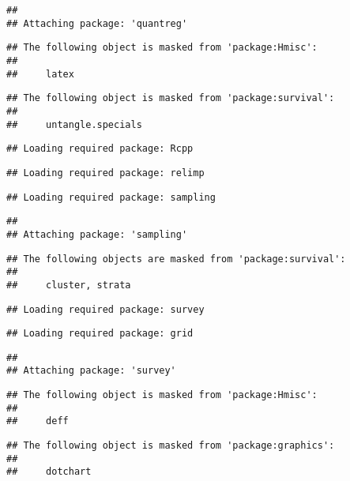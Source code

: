 \documentclass[11pt,]{article}
\begin{document}
\begin{verbatim}
## 
## Attaching package: 'quantreg'
\end{verbatim}

\begin{verbatim}
## The following object is masked from 'package:Hmisc':
## 
##     latex
\end{verbatim}

\begin{verbatim}
## The following object is masked from 'package:survival':
## 
##     untangle.specials
\end{verbatim}

\begin{verbatim}
## Loading required package: Rcpp
\end{verbatim}

\begin{verbatim}
## Loading required package: relimp
\end{verbatim}

\begin{verbatim}
## Loading required package: sampling
\end{verbatim}

\begin{verbatim}
## 
## Attaching package: 'sampling'
\end{verbatim}

\begin{verbatim}
## The following objects are masked from 'package:survival':
## 
##     cluster, strata
\end{verbatim}

\begin{verbatim}
## Loading required package: survey
\end{verbatim}

\begin{verbatim}
## Loading required package: grid
\end{verbatim}

\begin{verbatim}
## 
## Attaching package: 'survey'
\end{verbatim}

\begin{verbatim}
## The following object is masked from 'package:Hmisc':
## 
##     deff
\end{verbatim}

\begin{verbatim}
## The following object is masked from 'package:graphics':
## 
##     dotchart
\end{verbatim}
\end{document}
